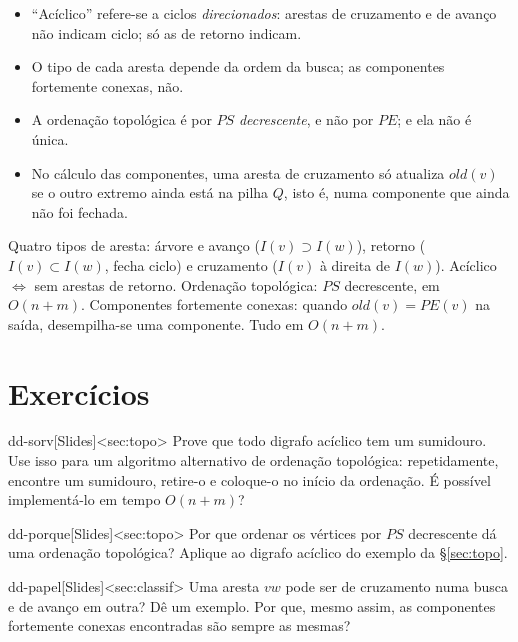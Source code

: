 \begin{cuidado}
\begin{itemize}
  \item ``Acíclico'' refere-se a ciclos \emph{direcionados}: arestas de cruzamento e de avanço não indicam ciclo; só as de retorno indicam.
  \item O tipo de cada aresta depende da ordem da busca; as componentes fortemente conexas, não.
  \item A ordenação topológica é por $PS$ \emph{decrescente}, e não por $PE$; e ela não é única.
  \item No cálculo das componentes, uma aresta de cruzamento só atualiza $old(v)$ se o outro extremo ainda está na pilha $Q$, isto é, numa componente que ainda não foi fechada.
\end{itemize}
\end{cuidado}

\begin{chave}
Quatro tipos de aresta: árvore e avanço ($I(v)\supset I(w)$), retorno ($I(v)\subset I(w)$, fecha ciclo) e cruzamento ($I(v)$ à direita de $I(w)$). Acíclico $\iff$ sem arestas de retorno. Ordenação topológica: $PS$ decrescente, em $O(n+m)$. Componentes fortemente conexas: quando $old(v)=PE(v)$ na saída, desempilha-se uma componente. Tudo em $O(n+m)$.
\end{chave}

\section{Exercícios}
\excurso
\begin{exercicio}{dd-sorv}[Slides]<sec:topo>
Prove que todo digrafo acíclico tem um sumidouro. Use isso para um algoritmo alternativo de ordenação topológica: repetidamente, encontre um sumidouro, retire-o e coloque-o no início da ordenação. É possível implementá-lo em tempo $O(n+m)$?
\end{exercicio}
\begin{exercicio}{dd-porque}[Slides]<sec:topo>
Por que ordenar os vértices por $PS$ decrescente dá uma ordenação topológica? Aplique ao digrafo acíclico do exemplo da §\ref{sec:topo}.
\end{exercicio}
\begin{exercicio}{dd-papel}[Slides]<sec:classif>
Uma aresta $vw$ pode ser de cruzamento numa busca e de avanço em outra? Dê um exemplo. Por que, mesmo assim, as componentes fortemente conexas encontradas são sempre as mesmas?
\end{exercicio}

